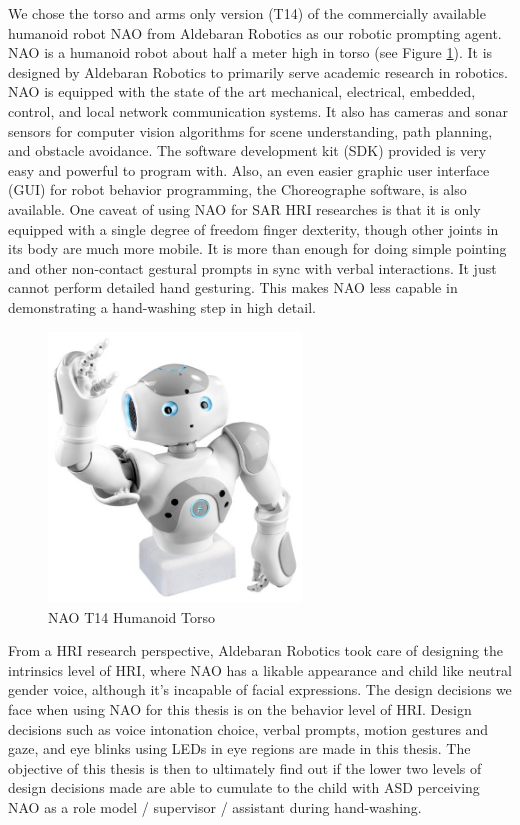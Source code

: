 \documentclass{ut-thesis}
\begin{document}
We chose the torso and arms only version (T14) of the commercially available humanoid robot NAO from Aldebaran Robotics as our robotic prompting agent.  NAO is a humanoid robot about half a meter high in torso (see Figure \ref{fig:NAOColor}).  It is designed by Aldebaran Robotics to primarily serve academic research in robotics.  NAO is equipped with the state of the art mechanical, electrical, embedded, control, and local network communication systems.  It also has cameras and sonar sensors for computer vision algorithms for scene understanding, path planning, and obstacle avoidance.  The software development kit (SDK) provided is very easy and powerful to program with.  Also, an even easier graphic user interface (GUI) for robot behavior programming, the Choreographe software, is also available.  One caveat of using NAO for SAR HRI researches is that it is only equipped with a single degree of freedom finger dexterity, though other joints in its body are much more mobile.  It is more than enough for doing simple pointing and other non-contact gestural prompts in sync with verbal interactions.  It just cannot perform detailed hand gesturing.  This makes NAO less capable in demonstrating a hand-washing step in high detail.
\begin{figure} [h]
	\centering
	\includegraphics[width=0.6\textwidth]{./img/nao-torso.jpg}
	\caption{NAO T14 Humanoid Torso}
	\label{fig:NAOColor}
\end{figure}


From a HRI research perspective, Aldebaran Robotics took care of designing the intrinsics level of HRI, where NAO has a likable appearance and child like neutral gender voice, although it's incapable of facial expressions.  The design decisions we face when using NAO for this thesis is on the behavior level of HRI.  Design decisions such as voice intonation choice, verbal prompts, motion gestures and gaze, and eye blinks using LEDs in eye regions are made in this thesis.  The objective of this thesis is then to ultimately find out if the lower two levels of design decisions made are able to cumulate to the child with ASD perceiving NAO as a role model / supervisor / assistant during hand-washing.
\end{document}

